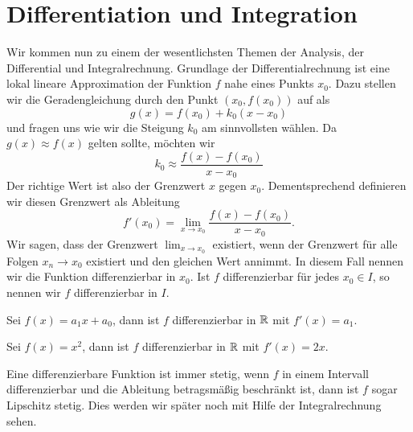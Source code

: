 \section{Differentiation und Integration}
\label{\detokenize{vorkurs/diffnint:differentiation-und-integration}}\label{\detokenize{vorkurs/diffnint::doc}}
Wir kommen nun zu einem der wesentlichsten Themen der Analysis, der Differential  und Integralrechnung. Grundlage der Differentialrechnung ist eine lokal lineare Approximation der Funktion \(f\) nahe eines Punkts \(x_0\). Dazu stellen wir die Geradengleichung durch den Punkt \((x_0,f(x_0))\) auf als
\begin{equation*}
 g(x) = f(x_0) + k_0 (x-x_0)\end{equation*}
und fragen uns wie wir die Steigung \(k_0\) am sinnvollsten wählen. Da \(g(x) \approx f(x)\) gelten sollte, möchten wir
\begin{equation*}
 k_0 \approx \frac{f(x) - f(x_0)}{x-x_0}\end{equation*}
Der richtige Wert ist also der Grenzwert \(x\) gegen \(x_0\).  Dementsprechend definieren wir diesen Grenzwert als Ableitung
\begin{equation*}
 f'(x_0) = \lim_{x \rightarrow x_0} \frac{f(x) - f(x_0)}{x-x_0}.\end{equation*}
Wir sagen, dass der Grenzwert \(\lim_{x \rightarrow x_0}\) existiert, wenn der Grenzwert für alle Folgen \(x_n \rightarrow x_0\) existiert und den gleichen Wert annimmt. In diesem Fall nennen wir die Funktion differenzierbar in \(x_0\). Ist \(f\) differenzierbar für jedes \(x_0 \in I\), so nennen wir \(f\) differenzierbar in \(I\).
\label{vorkurs/diffnint:example-0}
\begin{example}{}{}



Sei \(f(x) = a_1 x + a_0\), dann ist \(f\) differenzierbar in \(\mathbb{R}\) mit \(f'(x) = a_1\).
\end{example}
\label{vorkurs/diffnint:example-1}
\begin{example}{}{}



Sei \(f(x) = x^2\), dann ist \(f\) differenzierbar in \(\mathbb{R}\) mit \(f'(x) = 2x\).
\end{example}

Eine differenzierbare Funktion ist immer stetig, wenn \(f\) in einem Intervall differenzierbar und die Ableitung betragsmäßig beschränkt ist, dann ist \(f\) sogar Lipschitz stetig. Dies werden wir später noch mit Hilfe der Integralrechnung sehen.

